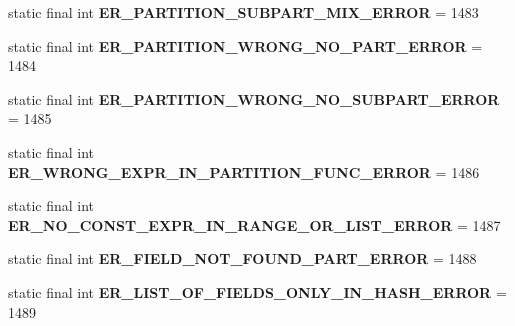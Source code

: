 \begin{DoxyCompactItemize}
static final int {\bfseries E\+R\+\_\+\+P\+A\+R\+T\+I\+T\+I\+O\+N\+\_\+\+S\+U\+B\+P\+A\+R\+T\+\_\+\+M\+I\+X\+\_\+\+E\+R\+R\+OR} = 1483
\item 
\mbox{\label{classcom_1_1mysql_1_1cj_1_1exceptions_1_1_mysql_error_numbers_a8426a5f1f9e00c029ba316eef524bf66}} 
static final int {\bfseries E\+R\+\_\+\+P\+A\+R\+T\+I\+T\+I\+O\+N\+\_\+\+W\+R\+O\+N\+G\+\_\+\+N\+O\+\_\+\+P\+A\+R\+T\+\_\+\+E\+R\+R\+OR} = 1484
\item 
\mbox{\label{classcom_1_1mysql_1_1cj_1_1exceptions_1_1_mysql_error_numbers_ab44e130d0da2aadc7707c5d9018e04bd}} 
static final int {\bfseries E\+R\+\_\+\+P\+A\+R\+T\+I\+T\+I\+O\+N\+\_\+\+W\+R\+O\+N\+G\+\_\+\+N\+O\+\_\+\+S\+U\+B\+P\+A\+R\+T\+\_\+\+E\+R\+R\+OR} = 1485
\item 
\mbox{\label{classcom_1_1mysql_1_1cj_1_1exceptions_1_1_mysql_error_numbers_a84fef6c76db093fecea6ed6bf4853208}} 
static final int {\bfseries E\+R\+\_\+\+W\+R\+O\+N\+G\+\_\+\+E\+X\+P\+R\+\_\+\+I\+N\+\_\+\+P\+A\+R\+T\+I\+T\+I\+O\+N\+\_\+\+F\+U\+N\+C\+\_\+\+E\+R\+R\+OR} = 1486
\item 
\mbox{\label{classcom_1_1mysql_1_1cj_1_1exceptions_1_1_mysql_error_numbers_af0cd4b95c72546d74d55c789211a3364}} 
static final int {\bfseries E\+R\+\_\+\+N\+O\+\_\+\+C\+O\+N\+S\+T\+\_\+\+E\+X\+P\+R\+\_\+\+I\+N\+\_\+\+R\+A\+N\+G\+E\+\_\+\+O\+R\+\_\+\+L\+I\+S\+T\+\_\+\+E\+R\+R\+OR} = 1487
\item 
\mbox{\label{classcom_1_1mysql_1_1cj_1_1exceptions_1_1_mysql_error_numbers_aa019d7b860be34f164b1a38dbda0fa9d}} 
static final int {\bfseries E\+R\+\_\+\+F\+I\+E\+L\+D\+\_\+\+N\+O\+T\+\_\+\+F\+O\+U\+N\+D\+\_\+\+P\+A\+R\+T\+\_\+\+E\+R\+R\+OR} = 1488
\item 
\mbox{\label{classcom_1_1mysql_1_1cj_1_1exceptions_1_1_mysql_error_numbers_a5316f5df637530ce12d34cf6d5fea794}} 
static final int {\bfseries E\+R\+\_\+\+L\+I\+S\+T\+\_\+\+O\+F\+\_\+\+F\+I\+E\+L\+D\+S\+\_\+\+O\+N\+L\+Y\+\_\+\+I\+N\+\_\+\+H\+A\+S\+H\+\_\+\+E\+R\+R\+OR} = 1489

\end{DoxyCompactItemize}
